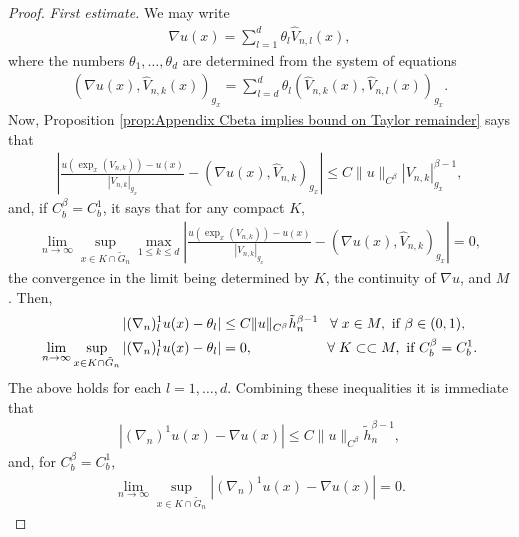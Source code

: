 \documentclass[11pt,reqno]{amsart}
\numberwithin{equation}{section}
\theoremstyle{plain}
\begin{document}
\begin{proof}
  \emph{First estimate.} We may write
  \begin{align*}	
    \nabla u(x) = \sum \limits_{l=1}^d  \theta_l \hat V_{n,l}(x),
  \end{align*}	 
  where the numbers $\theta_1,\ldots,\theta_d$ are determined from the system of equations
  \begin{align*}
    (\nabla u(x),\hat V_{n,k}(x))_{g_x} = \sum\limits_{l=d}^d \theta_l (\hat V_{n,k}(x),\hat V_{n,l}(x))_{g_x}.
  \end{align*}
  Now, Proposition \ref{prop:Appendix Cbeta implies bound on Taylor remainder} says that
  \begin{align*}
    \left | \frac{u(\exp_{x}(V_{n,k}))-u(x)}{|V_{n,k}|_{g_x}} - \left (\nabla u(x),\hat V_{n,k} \right )_{g_x}\right |\leq C\|u\|_{C^\beta}|V_{n,k}|_{g_x}^{\beta-1},
  \end{align*}
  and, if $C^\beta_b = C^1_b$, it says that for any compact $K$,
  \begin{align*}
    \lim \limits_{n\to \infty} \sup \limits_{x\in K \cap \tilde G_n} \max \limits_{1\leq k\leq d}\left | \frac{u(\exp_{x}(V_{n,k}))-u(x)}{|V_{n,k}|_{g_x}} - \left (\nabla u(x),\hat V_{n,k} \right )_{g_x}\right | = 0,
  \end{align*}  
  the convergence in the limit being determined by  $K$, the continuity of $\nabla u$, and $M$. Then, 
  \begin{align*}
    |(\nabla_n)_{l}^1u(x)-\theta_l| & \leq C\|u\|_{C^\beta}\tilde h_n^{\beta-1} \;\;\; \forall\;x\in M,\textnormal{ if } \beta \in (0,1),\\
    \lim \limits_{n\to \infty}\sup \limits_{x \in K \cap \tilde G_n}|(\nabla_n)_{l}^1u(x)-\theta_l| & = 0,   \quad\quad\quad\quad\quad\ \forall\; K\subset\subset M, \textnormal{ if } C^\beta_b = C^1_b.
  \end{align*}
  The above holds for each $l=1,\ldots,d$. Combining these inequalities it is immediate that
  \begin{align*}
    |(\nabla_n)^1u(x)-\nabla u(x)|\leq C\|u\|_{C^\beta}\tilde h_n^{\beta-1},
  \end{align*}
  and, for $C^\beta_b = C^1_b$,
  \begin{align*}
    \lim \limits_{n\to \infty}\sup \limits_{x \in K\cap \tilde G_n}|(\nabla_n)^1u(x)-\nabla u(x)|  = 0.
  \end{align*}
     

\end{proof}
\end{document}
